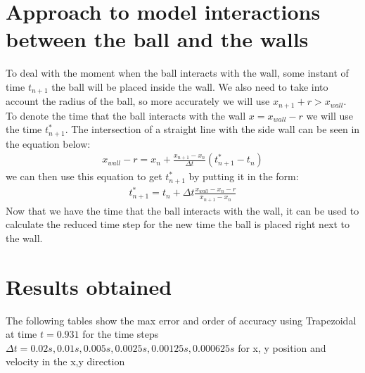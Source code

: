 \documentclass[12pt]{article}
\begin{document}
\section{Approach to model interactions between the ball and the walls}
To deal with the moment when the ball interacts with the wall, some instant of time $t_{n+1}$ the ball will be placed inside the wall.  We also need to take into account the radius of the ball, so more accurately  we will use $x_{n+1} +r > x_{wall}$.  To denote the time that the ball interacts with the wall $x = x_{wall} - r$ we will use the time $t^*_{n+1}$.  The intersection of a straight line with the side wall can be seen in the equation below:
\begin{eqnarray}
x_{wall} - r= x_{n} + \frac{x_{n+1}-x_n}{\Delta t} (t^*_{n+1}-t_n)\nonumber
\end{eqnarray}
we can then use this equation to get $t^*_{n+1}$ by putting it in the form:
\begin{eqnarray}
t^*_{n+1} = t_n + \Delta t \frac{x_{wall}-x_n - r}{x_{n+1} - x_n} \nonumber
\end{eqnarray}
Now that we have the time that the ball interacts with the wall, it can be used to calculate the reduced time step for the new time the ball is placed right next to the wall.


\section{Results obtained}
The following tables show the max error and order of accuracy using Trapezoidal at time $t = 0.931$ for the time steps $\Delta t = 0.02s, 0.01s, 0.005s, 0.0025s, 0.00125s, 0.000625s$ for x, y position and velocity in the x,y direction
\end{document}
